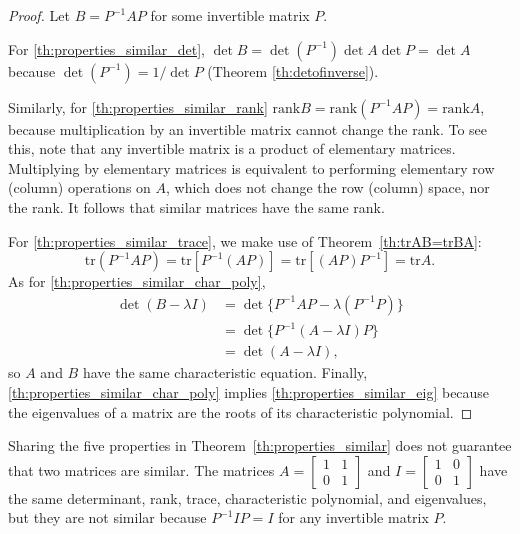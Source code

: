 \documentclass{ximera}
\begin{document}
\begin{proof}
Let $B = P^{-1}AP$ for some invertible matrix $P$.
 
For \ref{th:properties_similar_det}, $\det B = \det(P^{-1}) \det A \det P = \det A$ because $\det(P^{-1}) = 1/ \det P$ (Theorem \ref{th:detofinverse}).
 
Similarly, for \ref{th:properties_similar_rank} $\mbox{rank} B = \mbox{rank}(P^{-1}AP) = \mbox{rank} A$, because multiplication by an invertible matrix cannot change the rank.  To see this, note that any invertible matrix is a product of elementary matrices.  Multiplying by elementary matrices is equivalent to performing elementary row (column) operations on $A$, which does not change the row (column) space, nor the rank.  It follows that similar matrices have the same rank.
 
For \ref{th:properties_similar_trace}, we make use of Theorem~\ref{th:trAB=trBA}:
\begin{equation*}
\mbox{tr} (P^{-1}AP) = \mbox{tr}[P^{-1}(AP)] = \mbox{tr}[(AP)P^{-1}] = \mbox{tr} A.
\end{equation*}
As for \ref{th:properties_similar_char_poly},
\begin{align*}
\det(B-\lambda I) &= \det \{P^{-1}AP-\lambda(P^{-1}P)\} \\
&= \det \{ P^{-1}(A-\lambda I)P\} \\
&= \det (A-\lambda I),
\end{align*} so $A$ and $B$ have the same characteristic equation.
Finally, \ref{th:properties_similar_char_poly} implies \ref{th:properties_similar_eig} because the eigenvalues of a matrix are the roots of its characteristic polynomial.
\end{proof}
 
\begin{remark}\label{rem:fivePropSim}
Sharing the five properties in Theorem~\ref{th:properties_similar} does not guarantee that two matrices are similar. The matrices
$A = \begin{bmatrix}
1 & 1 \\
0 & 1
\end{bmatrix}$ and $I = \begin{bmatrix}
1 & 0 \\
0 & 1
\end{bmatrix}$ have the same determinant, rank, trace, characteristic polynomial, and eigenvalues, but they are not similar because $P^{-1}IP = I$ for any invertible matrix $P$.
\end{remark}
 
\end{document}
